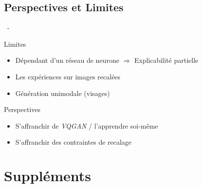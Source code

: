 \documentclass[aspectratio=169, 22pt]{beamer}
\begin{document}
\subsection{Perspectives et Limites}
\begin{frame}{\secname~- \subsecname}
  \begin{alertblock}{Limites}
    \begin{itemize}
    \item Dépendant d'un réseau de neurone $\Rightarrow$ Explicabilité partielle
    \item Les expériences sur images recalées
    \item Génération unimodale (visages)
    \end{itemize}
  \end{alertblock}

  \pause
  \begin{block}{Perspectives}
    \begin{itemize}
    \item S'affranchir de \emph{VQGAN} / l'apprendre soi-même
    \item S'affranchir des contraintes de recalage
    \end{itemize}
  \end{block}
\end{frame}

\makethanks

\section{Suppléments}
\end{document}
